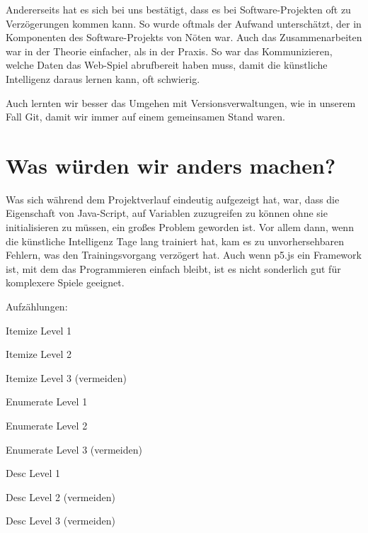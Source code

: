 Andererseits hat es sich bei uns bestätigt, dass es bei Software-Projekten oft zu Verzögerungen kommen kann.
So wurde oftmals der Aufwand unterschätzt, der in Komponenten des Software-Projekts von Nöten war.
Auch das Zusammenarbeiten war in der Theorie einfacher, als in der Praxis. So war das Kommunizieren, welche Daten das Web-Spiel abrufbereit haben muss, damit die künstliche Intelligenz daraus lernen kann, oft schwierig.

Auch lernten wir besser das Umgehen mit Versionsverwaltungen, wie in unserem Fall Git, damit wir immer auf einem gemeinsamen Stand waren.

\section{Was würden wir anders machen?}
Was sich während dem Projektverlauf eindeutig aufgezeigt hat, war, dass die Eigenschaft von Java-Script, auf Variablen zuzugreifen zu können ohne sie initialisieren zu müssen, ein großes Problem geworden ist.
Vor allem dann, wenn die künstliche Intelligenz Tage lang trainiert hat, kam es zu unvorhersehbaren Fehlern, was den Trainingsvorgang verzögert hat.
Auch wenn p5.js ein Framework ist, mit dem das Programmieren einfach bleibt, ist es nicht sonderlich gut für komplexere Spiele geeignet.


Aufzählungen:

\begin{compactitem}
    \item Itemize Level 1
    \begin{compactitem}
        \item Itemize Level 2
        \begin{compactitem}
            \item Itemize Level 3 (vermeiden)
        \end{compactitem}
    \end{compactitem}
\end{compactitem}

\begin{compactenum}
    \item Enumerate Level 1
    \begin{compactenum}
        \item Enumerate Level 2
        \begin{compactenum}
            \item Enumerate Level 3 (vermeiden)
        \end{compactenum}
    \end{compactenum}
\end{compactenum}

\begin{compactdesc}
    \item[Desc] Level 1
    \begin{compactdesc}
        \item[Desc] Level 2 (vermeiden)
        \begin{compactdesc}
            \item[Desc] Level 3 (vermeiden)
        \end{compactdesc}
    \end{compactdesc}
\end{compactdesc}